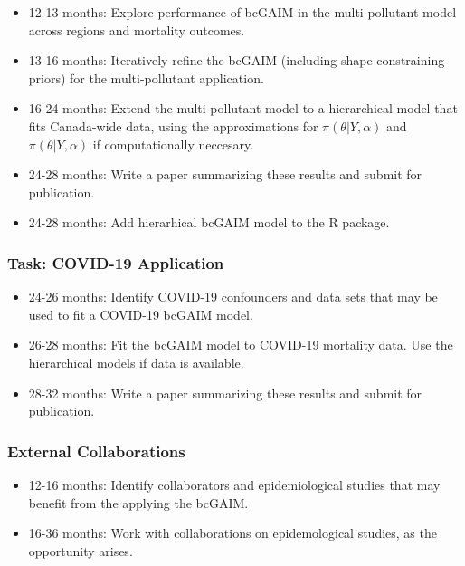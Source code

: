 \documentclass[12pt,letterpaper]{article}
\begin{document}
\begin{itemize}
    \item 12-13 months: Explore performance of bcGAIM in the multi-pollutant model across regions and mortality outcomes.
    \item 13-16 months: Iteratively refine the bcGAIM (including shape-constraining priors) for the multi-pollutant application.
    \item 16-24 months: Extend the multi-pollutant model to a hierarchical model that fits Canada-wide data, using the approximations for $\pi( \theta | Y, \alpha )$ and $\pi( \theta | Y, \alpha )$ if computationally neccesary. 
    \item 24-28 months: Write a paper summarizing these results and submit for publication. 
    \item 24-28 months: Add hierarhical bcGAIM model to the R package.
\end{itemize}

\hypertarget{task-covid-19-application}{%
\subsubsection{Task: COVID-19
Application}\label{task-covid-19-application}}

\begin{itemize}
    \item 24-26 months: Identify COVID-19 confounders and data sets that may be used to fit a COVID-19 bcGAIM model. 
    \item 26-28 months: Fit the bcGAIM model to COVID-19 mortality data. Use the hierarchical models if data is available. 
    \item 28-32 months: Write a paper summarizing these results and submit for publication. 
\end{itemize}

\hypertarget{external-collaborations}{%
\subsubsection{External Collaborations}\label{external-collaborations}}

\begin{itemize}
    \item 12-16 months: Identify collaborators and epidemiological studies that may benefit from the applying the bcGAIM.
    \item 16-36 months: Work with collaborations on epidemological studies, as the opportunity arises.
\end{itemize}
\end{document}
